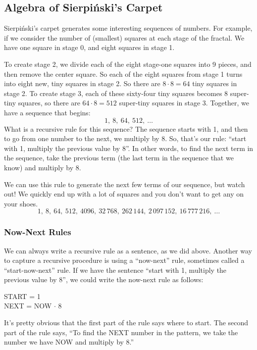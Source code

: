 \subsection{Algebra of Sierpi\'nski's Carpet}

Sierpi\'nski's carpet generates some interesting sequences of numbers. For example, if we consider the number of (smallest) squares at each stage of the fractal. We have one square in stage 0, and eight squares in stage 1.

To create stage 2, we divide each of the eight stage-one squares into 9 pieces, and then remove the center square. So each of the eight squares from stage 1 turns into eight new, tiny squares in stage 2. So there are $8\cdot8 = 64$ tiny squares in stage 2. To create stage 3, each of these sixty-four tiny squares becomes 8 super-tiny squares, so there are $64 \cdot 8 = 512$ super-tiny squares in stage 3. Together, we have a sequence that begins: \[1,~ 8,~ 64,~ 512,~\dotsc\]
What is a recursive rule for this sequence? The sequence starts with 1, and then to go from one number to the next, we multiply by 8. So, that's our rule: ``start with 1, multiply the previous value by 8''. In other words, to find the next term in the sequence, take the previous term (the last term in the sequence that we know) and multiply by 8.

We can use this rule to generate the next few terms of our sequence, but watch out! We quickly end up with a lot of squares and you don't want to get any on your shoes. \[1,~ 8,~ 64,~ 512,~ 4096,~ 32\,768,~ 262\,144,~ 2\,097\,152,~ 16\,777\,216,~ \dotsc\]

\subsubsection{Now-Next Rules}

We can always write a recursive rule as a sentence, as we did above. Another way to capture a recursive procedure is using a ``now-next'' rule, sometimes called a ``start-now-next'' rule. If we have the sentence ``start with 1, multiply the previous value by 8'', we could write the now-next rule as follows:

\begin{center}
START = 1 \\
NEXT = NOW $\cdot$ 8
\end{center}

It's pretty obvious that the first part of the rule says where to start. The second part of the rule says, ``To find the NEXT number in the pattern, we take the number we have NOW and multiply by 8.''

